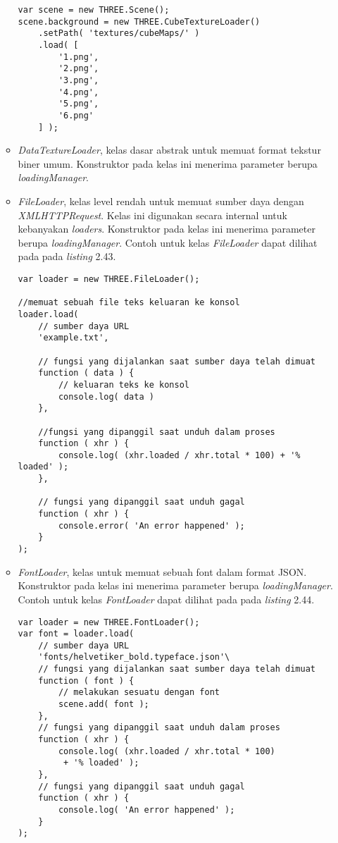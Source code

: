 \begin{itemize}
\begin{itemize}
\begin{lstlisting}[caption={Contoh penggunaan kelas {\it CubeTextureLoader} menggunakan gambar dengan format PNG di setiap sisinya.},captionpos=b]
var scene = new THREE.Scene();
scene.background = new THREE.CubeTextureLoader()
	.setPath( 'textures/cubeMaps/' )
	.load( [
		'1.png',
		'2.png',
		'3.png',
		'4.png',
		'5.png',
		'6.png'
	] );
\end{lstlisting}

	\item {\it DataTextureLoader}, kelas dasar abstrak untuk memuat format tekstur biner umum. Konstruktor pada kelas ini menerima parameter berupa  {\it loadingManager}.
	
	\item {\it FileLoader}, kelas level rendah untuk memuat sumber daya dengan {\it XMLHTTPRequest}. Kelas ini digunakan secara internal untuk kebanyakan {\it loaders}. Konstruktor pada kelas ini menerima parameter berupa  {\it loadingManager}. Contoh untuk kelas {\it FileLoader} dapat dilihat pada pada {\it listing} 2.43.
	
\begin{lstlisting}[caption={Contoh penggunaan kelas {\it FileLoader} untuk berkas dengan format TXT.},captionpos=b]
var loader = new THREE.FileLoader();

//memuat sebuah file teks keluaran ke konsol
loader.load(
    // sumber daya URL
    'example.txt',

    // fungsi yang dijalankan saat sumber daya telah dimuat
    function ( data ) {
        // keluaran teks ke konsol
        console.log( data )
    },

    //fungsi yang dipanggil saat unduh dalam proses
    function ( xhr ) {
        console.log( (xhr.loaded / xhr.total * 100) + '% loaded' );
    },

    // fungsi yang dipanggil saat unduh gagal
    function ( xhr ) {
        console.error( 'An error happened' );
    }
);

\end{lstlisting}

	\item {\it FontLoader}, kelas untuk memuat sebuah font dalam format JSON. Konstruktor pada kelas ini menerima parameter berupa  {\it loadingManager}. Contoh untuk kelas {\it FontLoader} dapat dilihat pada pada {\it listing} 2.44.
	
\begin{lstlisting}[caption={Contoh penggunaan kelas {\it FontLoader}.},captionpos=b]
var loader = new THREE.FontLoader();
var font = loader.load(
	// sumber daya URL
	'fonts/helvetiker_bold.typeface.json'\
	// fungsi yang dijalankan saat sumber daya telah dimuat
	function ( font ) {
		// melakukan sesuatu dengan font
		scene.add( font );
	},
	// fungsi yang dipanggil saat unduh dalam proses
	function ( xhr ) {
		console.log( (xhr.loaded / xhr.total * 100)
		 + '% loaded' );
	},
	// fungsi yang dipanggil saat unduh gagal
	function ( xhr ) {
		console.log( 'An error happened' );
	}
);
\end{lstlisting}


\end{itemize}
\end{itemize}
